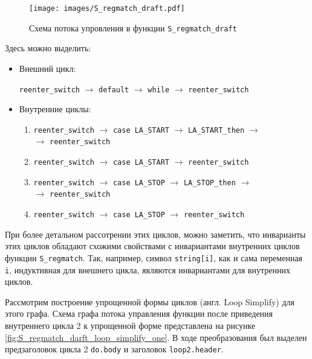 \begin{figure}
    \centering
    \texttt{[image: images/S\_regmatch\_draft.pdf]}
    \caption{Схема потока упровления в функции \texttt{S\_regmatch\_draft}}
    \label{fig:S_regmatch_darft}
\end{figure}

Здесь можно выделить:
\begin{itemize}
    \item Внешний цикл:

        \texttt{reenter\_switch} $\rightarrow$ \texttt{default} $\rightarrow$ \texttt{while} $\rightarrow$ \texttt{reenter\_switch}

    \item Внутренние циклы:

        \begin{enumerate}
            \item \texttt{reenter\_switch} $\rightarrow$ \texttt{case LA\_START} $\rightarrow$ \texttt{LA\_START\_then} $\rightarrow$\\ $\rightarrow$ \texttt{reenter\_switch}
            \item \texttt{reenter\_switch} $\rightarrow$ \texttt{case LA\_START} $\rightarrow$ \texttt{reenter\_switch}
            \item \texttt{reenter\_switch} $\rightarrow$ \texttt{case LA\_STOP} $\rightarrow$ \texttt{LA\_STOP\_then} $\rightarrow$\\$\rightarrow$ \texttt{reenter\_switch}
            \item \texttt{reenter\_switch} $\rightarrow$ \texttt{case LA\_STOP} $\rightarrow$ \texttt{reenter\_switch}
        \end{enumerate}
\end{itemize}

При более детальном рассотрении этих циклов, можно заметить, что инварианты этих циклов обладают схожими свойствами с инвариантами внутренних циклов функции \texttt{S\_regmatch}.
Так, например, символ \texttt{string[i]}, как и сама переменная \texttt{i}, индуктивная для внешнего цикла, являются инвариантами для внутренних циклов.

Рассмотрим построение упрощенной формы циклов (англ. Loop Simplify) для этого графа.
Схема графа потока управления функции после приведения внутреннего цикла 2 к упрощенной форме представлена на рисунке \ref{fig:S_regmatch_darft_loop_simplify_one}.
В ходе преобразования был выделен предзаголовок цикла 2 \texttt{do.body} и заголовок \texttt{loop2.header}.

